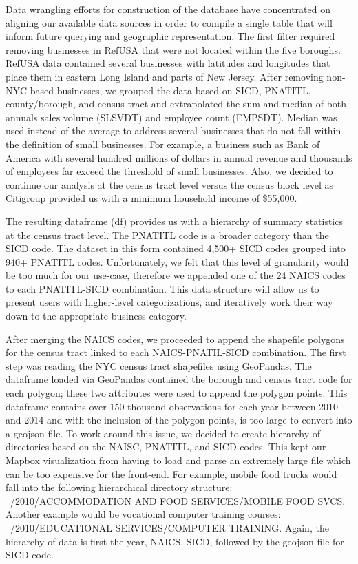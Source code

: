 \documentclass[article, 11pt]{article} %
\begin{document}
Data wrangling efforts for construction of the database have concentrated on aligning our available data sources in order to compile a single table that will inform future querying and geographic representation. The first filter required removing businesses in RefUSA that were not located within the five boroughs. RefUSA data contained several businesses with latitudes and longitudes that place them in eastern Long Island and parts of New Jersey. After removing non-NYC based businesses, we grouped the data based on SICD, PNATITL, county/borough, and census tract and extrapolated the sum and median of both annuals sales volume (SLSVDT) and employee count (EMPSDT). Median was used instead of the average to address several businesses that do not fall within the definition of small businesses. For example, a business such as Bank of America with several hundred millions of dollars in annual revenue and thousands of employees far exceed the threshold of small businesses. Also, we decided to continue our analysis at the census tract level versus the census block level as Citigroup provided us with a minimum household income of \$55,000.

The resulting dataframe (df) provides us with a hierarchy of summary statistics at the census tract level. The PNATITL code is a broader category than the SICD code. The dataset in this form contained 4,500+ SICD codes grouped into 940+ PNATITL codes. Unfortunately, we felt that this level of granularity would be too much for our use-case, therefore we appended one of the 24 NAICS codes to each PNATITL-SICD combination. This data structure will allow us to present users with higher-level categorizations, and iteratively work their way down to the appropriate business category.

After merging the NAICS codes, we proceeded to append the shapefile polygons for the census tract linked to each NAICS-PNATIL-SICD combination. The first step was reading the NYC census tract shapefiles using GeoPandas. The dataframe loaded via GeoPandas contained the borough and census tract code for each polygon; these two attributes were used to append the polygon points. This dataframe contains over 150 thousand observations for each year between 2010 and 2014 and with the inclusion of the polygon points, is too large to convert into a geojson file. To work around this issue, we decided to create hierarchy of directories based on the NAISC, PNATITL, and SICD codes. This kept our Mapbox visualization from having to load and parse an extremely large file which can be too expensive for the front-end. For example, mobile food trucks would fall into the following hierarchical directory structure: ~/2010/ACCOMMODATION AND FOOD SERVICES/MOBILE FOOD SVCS. Another example would be vocational computer training courses: ~/2010/EDUCATIONAL SERVICES/COMPUTER TRAINING. Again, the hierarchy of data is first the year, NAICS, SICD, followed by the geojson file for SICD code.
\end{document}
